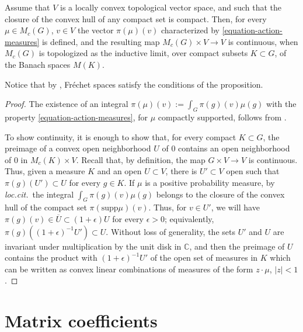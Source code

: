 \begin{proposition}
\label{proposition-integral-lcs}
 Assume that $V$ is a locally convex topological vector space, and such that the closure of the convex hull of any compact set is compact. Then, for every $\mu\in M_c(G)$, $v\in V$ the vector $\pi(\mu)(v)$ characterized by \eqref{equation-action-measures} is defined, and the resulting map $M_c(G)\times V \to V$ is continuous, when $M_c(G)$ is topologized as the inductive limit, over compact subsets $K\subset G$, of the Banach spaces $M(K)$. 
\end{proposition}

Notice that by \cite[Theorem 3.20]{Rudin}, Fr\'echet spaces satisfy the conditions of the proposition.

\begin{proof}
 The existence of an integral $\pi(\mu)(v):= \int_{G} \pi(g)(v) \mu(g)$ with the property \eqref{equation-action-measures}, for $\mu$ compactly supported, follows from \cite[Theorem 3.27]{Rudin}. 
 
 To show continuity, it is enough to show that, for every compact $K\subset G$, the preimage of a convex open neighborhood $U$ of $0$ contains an open neighborhood of $0$ in $M_c(K)\times V$. Recall that, by definition, the map $G\times V\to V$ is continuous. Thus, given a measure $K$ and an open $U\subset V$,  there is $U'\subset V$ open such that $\pi(g)(U')\subset U$ for every $g\in K$. If $\mu$ is a positive probability measure, by {\it loc.cit.\ }the integral $\int_{G} \pi(g)(v) \mu(g)$ belongs to the closure of the convex hull of the compact set $\pi(\text{supp} \mu)(v)$. Thus, for $v\in U'$, we will have $\pi(g)(v) \in \overline{U} \subset (1+\epsilon) U$ for every $\epsilon >0$; equivalently, $\pi(g)( (1+\epsilon)^{-1} U') \subset U$. Without loss of generality, the sets  $U'$ and $U$ are invariant under multiplication by the unit disk in $\mathbb C$, and then the preimage of $U$ contains the product with $(1+\epsilon)^{-1} U'$ of the open set of measures in $K$ which can be written as convex linear combinations of measures of the form $z\cdot \mu$, $|z|<1$.
\end{proof}






\section{Matrix coefficients} 
\label{section-matrixcoefficients}

